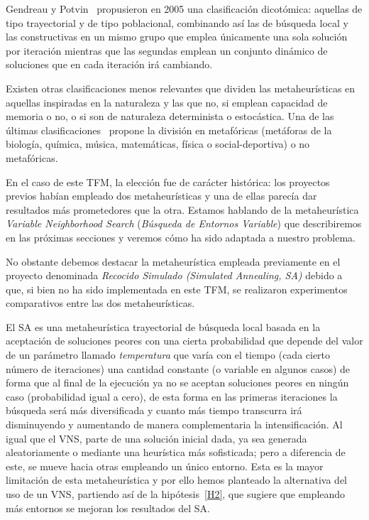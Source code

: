 Gendreau y Potvin~\cite{metaheuristicas:taxonomia2} propusieron en 2005 una clasificación dicotómica: aquellas de tipo trayectorial y de tipo poblacional, combinando así las de búsqueda local y las constructivas en un mismo grupo que emplea únicamente una sola solución por iteración mientras que las segundas emplean un conjunto dinámico de soluciones que en cada iteración irá cambiando.

Existen otras clasificaciones menos relevantes que dividen las metaheurísticas en aquellas inspiradas en la naturaleza y las que no, si emplean capacidad de memoria o no, o si son de naturaleza determinista o estocástica. Una de las últimas clasificaciones~\cite{sota:metaheuristicas} propone la división en metafóricas (metáforas de la biología, química, música, matemáticas, física o social-deportiva) o no metafóricas.

En el caso de este TFM, la elección fue de carácter histórica: los proyectos previos habían empleado dos metaheurísticas y una de ellas parecía dar resultados más prometedores que la otra. Estamos hablando de la metaheurística \textit{Variable Neighborhood Search} (\textit{Búsqueda de Entornos Variable}) que describiremos en las próximas secciones y veremos cómo ha sido adaptada a nuestro problema.

No obstante debemos destacar la metaheurística empleada previamente en el proyecto \legacy{} denominada \textit{Recocido Simulado (Simulated Annealing, SA)} debido a que, si bien no ha sido implementada en este TFM, se realizaron experimentos comparativos entre las dos metaheurísticas.

El SA es una metaheurística trayectorial de búsqueda local basada en la aceptación de soluciones peores con una cierta probabilidad que depende del valor de un parámetro llamado \textit{temperatura} que varía con el tiempo (cada cierto número de iteraciones) una cantidad constante (o variable en algunos casos) de forma que al final de la ejecución ya no se aceptan soluciones peores en ningún caso (probabilidad igual a cero), de esta forma en las primeras iteraciones la búsqueda será más diversificada y cuanto más tiempo transcurra irá disminuyendo y aumentando de manera complementaria la intensificación. Al igual que el VNS, parte de una solución inicial dada, ya sea generada aleatoriamente o mediante una heurística más sofisticada; pero a diferencia de este, se mueve hacia otras empleando un único entorno. Esta es la mayor limitación de esta metaheurística y por ello hemos planteado la alternativa del uso de un VNS, partiendo así de la hipótesis~\ref{H2}, que sugiere que empleando más entornos se mejoran los resultados del SA\@.

